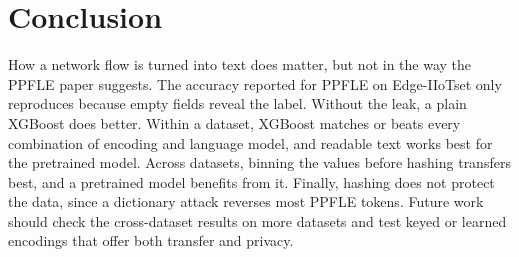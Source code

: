 \section{Conclusion}\label{sec:conclusion}
How a network flow is turned into text does matter, but not in the way the PPFLE paper suggests. The
 accuracy reported for PPFLE on Edge-IIoTset only reproduces because empty fields reveal the
label. Without the leak, a plain XGBoost does better. Within a dataset, XGBoost matches or beats every combination of
encoding and language model, and readable text works best for the pretrained model. Across datasets, binning the values before hashing transfers
best, and a pretrained model benefits from it. Finally, hashing does not protect the data, since a dictionary attack
reverses most PPFLE tokens. Future work should check the cross-dataset results on more datasets and test keyed or
learned encodings that offer both transfer and privacy.
